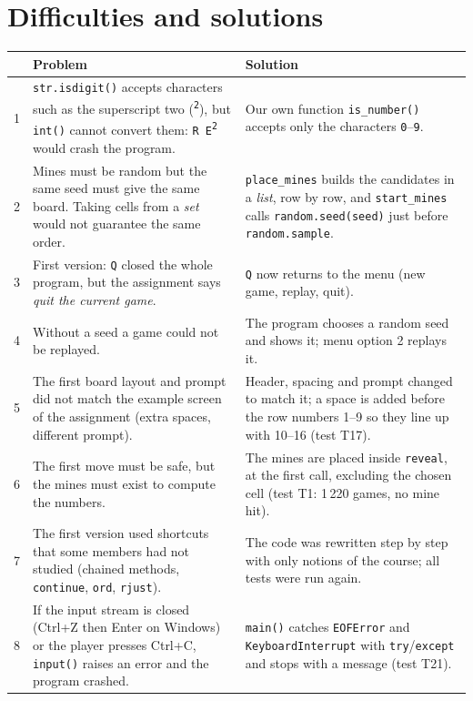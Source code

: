 \documentclass[11pt,a4paper]{article}
\newcommand{\code}[1]{\texttt{#1}}
\begin{document}
\section{Difficulties and solutions}

\begin{center}
\small
\begin{tabularx}{\linewidth}{l X X}
\toprule
& \textbf{Problem} & \textbf{Solution}\\
\midrule
1 & \code{str.isdigit()} accepts characters such as the superscript two (\code{\textsuperscript{2}}),
  but \code{int()} cannot convert them: \code{R E\textsuperscript{2}} would crash the program. &
  Our own function \code{is\_number()} accepts only the characters \code{0}--\code{9}.\\
2 & Mines must be random but the same seed must give the same board. Taking cells from a
  \emph{set} would not guarantee the same order. &
  \code{place\_mines} builds the candidates in a \emph{list}, row by row, and \code{start\_mines}
  calls \code{random.seed(seed)} just before \code{random.sample}.\\
3 & First version: \code{Q} closed the whole program, but the assignment says \emph{quit the
  current game}. & \code{Q} now returns to the menu (new game, replay, quit).\\
4 & Without a seed a game could not be replayed. & The program chooses a random seed and shows it;
  menu option 2 replays it.\\
5 & The first board layout and prompt did not match the example screen of the assignment
  (extra spaces, different prompt). & Header, spacing and prompt changed to match it;
  a space is added before the row numbers 1--9 so they line up with 10--16 (test T17).\\
6 & The first move must be safe, but the mines must exist to compute the numbers. &
  The mines are placed inside \code{reveal}, at the first call, excluding the chosen cell
  (test T1: 1\,220 games, no mine hit).\\
7 & The first version used shortcuts that some members had not studied (chained methods, \code{continue},
  \code{ord}, \code{rjust}). & The code was rewritten step by step with only notions of the course;
  all tests were run again.\\
8 & If the input stream is closed (Ctrl+Z then Enter on Windows) or the player presses Ctrl+C,
  \code{input()} raises an error and the program crashed. & \code{main()} catches \code{EOFError} and
  \code{KeyboardInterrupt} with \code{try}/\code{except} and stops with a message (test T21).\\
\bottomrule
\end{tabularx}
\end{center}
\end{document}
